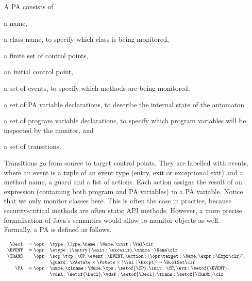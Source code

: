 A PA consists of
\begin{inparaenum}
\item a name,
\item a class name, to specify which class is being monitored,
\item a finite set of control points,
\item an initial control point,
\item a set of events, to specify which methods are being monitored,
\item a set of PA variable declarations, to describe
the internal state of the automaton
\item a set of program variable declarations, to specify which
program variables will be inspected by the monitor, and
\item a set of transitions.
\end{inparaenum}
Transitions go from source to target control points. They are labelled
with events, where an event is a tuple of an event type (entry, exit
or exceptional exit) and a method name, a guard and a list of
actions. Each action assigns the result of an expression (containing
both program and PA variables) to a PA
variable. Notice that we only monitor classes here. This is often
the case in practice, because security-critical methods are often
static API methods. However, a more precise formalisation of Java's semantics
would allow to monitor objects as well. Formally, a PA is defined as follows.

\vspace*{-1em}
\[{\small
\begin{array}{rcl}
\Decl & = \opr & \type : \Type, \name : \Name, \init : \Val
\clr \\
\EVENT & = \opr & \etype : (\entry \mid \exit \mid \excexit),
                 \mname : \Name \clr\\
\TRANS & = \opr & \scp, \tcp : \CP, \event : \EVENT, \action : (\opr \target : \Name, \expr : \Expr \clr)^*, \\
& &
\guard : \PAstate \times \Pstate \times (\Val \mid \Excpt) \rightarrow \BoolSet\clr\\
\PA & = \opr & \name, \clname : \Name, \cps : \setof{\CP},
            \init : \CP, \evs : \setof{\EVENT},\\
     &   &  \vdsA : \setof{\Decl}, \vdsP : \setof{\Decl},
            \trans : \setof{\TRANS} \clr
\end{array}}
\]

